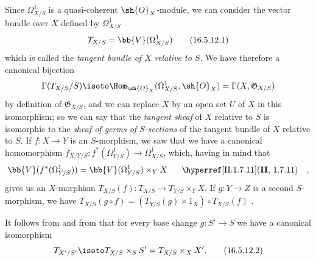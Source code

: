 \begin{env}[16.5.12]
\label{IV.16.5.12}
Since $\Omega_{X/S}^1$ is a quasi-coherent $\sh{O}_X$-module, we can consider the vector bundle over $X$ defined by $\Omega_{X/S}^1$ 
\[
  \label{IV.16.5.12.1}
  T_{X/S} = \bb{V}(\Omega_{X/S}^1)
  \tag{16.5.12.1}
\]
which is called the \emph{tangent bundle of $X$ relative to $S$}.
We have therefore a canonical bijection 
\[
  \Gamma(T_{X/S}/S) \isoto \Hom_{\sh{O}_X}(\Omega_{X/S}^1, \sh{O}_X) = \Gamma(X, \mathfrak{G}_{X/S})
\]
by definition of $\mathfrak{G}_{X/S}$, and we can replace $X$ by an open set $U$ of $X$ in this isomorphism;
so we can say that the \emph{tangent sheaf} of $X$ relative to $S$ is isomorphic to the \emph{sheaf of germs of $S$-sections} of the tangent bundle of $X$ relative to $S$.
If $f:X \to Y$ is an $S$-morphism, we saw  that we have a canonical homomorphism $f_{X/Y/S}:f^*(\Omega_{Y/S}^1) \to \Omega_{X/S}^1$, which, having in mind that
\[
  \bb{V}(f^*(\Omega_{Y/S}^1)) = \bb{V}(\Omega_{Y/S}^1) \times_Y X \quad \text{\sref[II]{II.1.7.11} },
\]
gives us an $X$-morphism $T_{X/S}(f): T_{X/S} \to T_{Y/S} \times_Y X$.
If $g:Y \to Z$ is a second $S$-morphism, we have $T_{X/S}(g \circ f) = (T_{Y/S}(g) \times 1_X ) \circ T_{X/S}(f)$ .

It follows from  and from  that for every base change $g:S' \to S$ we have a canonical isomorphism
\[
  \label{IV.16.5.12.2}
  T_{X'/S'} \isoto T_{X/S} \times_S S' = T_{X/S} \times_X X'.
  \tag{16.5.12.2}
\]
\end{env}

